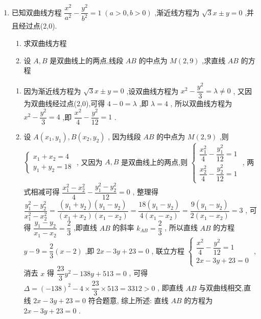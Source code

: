 \begin{enumerate}
    \item 已知双曲线方程 $\dfrac{{x}^{2}}{{a}^{2}} - \dfrac{{y}^{2}}{{b}^{2}} = 1\;\left( {a > 0,b > 0}\right)$ ,渐近线方程为 $\sqrt{3}x \pm  y = 0$ ,并且经过点(2,0).
    \begin{enumerate}
        \item 求双曲线方程
        \item 设 $A,B$ 是双曲线上的两点,线段 ${AB}$ 的中点为 $M\left( {2,9}\right)$ ,求直线 ${AB}$ 的方程
    \end{enumerate}
    \begin{jieda}
        \begin{enumerate}
            \item 因为渐近线方程为 $\sqrt{3}x \pm  y = 0$ ,设双曲线方程为 ${x}^{2} - \dfrac{{y}^{2}}{3} = \lambda  \neq  0$ ,
            又因为双曲线经过点(2,0),可得 $4 - 0 = \lambda$ ,即 $\lambda  = 4$ ,
            所以双曲线方程为 ${x}^{2} - \dfrac{{y}^{2}}{3} = 4$ ,即 $\dfrac{{x}^{2}}{4} - \dfrac{{y}^{2}}{12} = 1$ .
            \item 设 $A\left( {{x}_{1},{y}_{1}}\right) ,B\left( {{x}_{2},{y}_{2}}\right)$ ,
            因为线段 ${AB}$ 的中点为 $M\left( {2,9}\right)$ ,则 $\left\{  \begin{array}{l} {x}_{1} + {x}_{2} = 4 \\  {y}_{1} + {y}_{2} = {18} \end{array}\right.$ ,
            又因为 $A,B$ 是双曲线上的两点,则 $\left\{  \begin{array}{l} \dfrac{{x}_{1}^{2}}{4} - \dfrac{{y}_{1}^{2}}{12} = 1 \\  \dfrac{{x}_{2}^{2}}{4} - \dfrac{{y}_{2}^{2}}{12} = 1 \end{array}\right.$ ,
            两式相减可得 $\dfrac{{x}_{1}^{2} - {x}_{2}^{2}}{4} - \dfrac{{y}_{1}^{2} - {y}_{2}^{2}}{12} = 0$ ,
            整理得 $\dfrac{{y}_{1}^{2} - {y}_{2}^{2}}{{x}_{1}^{2} - {x}_{2}^{2}} = \dfrac{\left( {{y}_{1} + {y}_{2}}\right) \left( {{y}_{1} - {y}_{2}}\right) }{\left( {{x}_{1} + {x}_{2}}\right) \left( {{x}_{1} - {x}_{2}}\right) } = \dfrac{{18}\left( {{y}_{1} - {y}_{2}}\right) }{4\left( {{x}_{1} - {x}_{2}}\right) } = \dfrac{9\left( {{y}_{1} - {y}_{2}}\right) }{2\left( {{x}_{1} - {x}_{2}}\right) } = 3$ ,
            可得 $\dfrac{{y}_{1} - {y}_{2}}{{x}_{1} - {x}_{2}} = \dfrac{2}{3}$ ,即直线 ${AB}$ 的斜率 ${k}_{AB} = \dfrac{2}{3}$ ,
            所以直线 ${AB}$ 的方程 $y - 9 = \dfrac{2}{3}\left( {x - 2}\right)$ ,即 ${2x} - {3y} + {23} = 0$ ,
            联立方程 $\left\{  \begin{array}{l} \dfrac{{x}^{2}}{4} - \dfrac{{y}^{2}}{12} = 1 \\  {2x} - {3y} + {23} = 0 \end{array}\right.$ ,消去 $x$ 得 $\dfrac{23}{3}{y}^{2} - {138y} + {513} = 0$ ,
            可得 $\Delta  = {\left( -{138}\right) }^{2} - 4 \times  \dfrac{23}{3} \times  {513} = {3312} > 0$ ,
            即直线 ${AB}$ 与双曲线相交,直线 ${2x} - {3y} + {23} = 0$ 符合题意,
            综上所述: 直线 ${AB}$ 的方程为 ${2x} - {3y} + {23} = 0$ .
        \end{enumerate}
    \end{jieda}


\end{enumerate}
